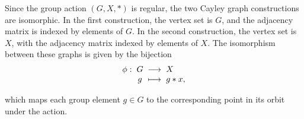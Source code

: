 \documentclass[11pt]{article}
\theoremstyle{definition}
\newcommand{\qft}{\mathsf{QFT}}
\begin{document}
    Since the group action \( (G, X, *) \) is regular, the two Cayley graph constructions are isomorphic. In the first construction, the vertex set is \( G \), and the adjacency matrix is indexed by elements of \( G \). In the second construction, the vertex set is \( X \), with the adjacency matrix indexed by elements of \( X \). The isomorphism between these graphs is given by the bijection
\[
\setlength{\arraycolsep}{1mm}
\begin{array}{rcll}
\phi: & G & \longrightarrow & X \\
      & g & \longmapsto     & g * x,
\end{array}
\]

which maps each group element \( g \in G \) to the corresponding point in its orbit under the action.


    
\end{document}

